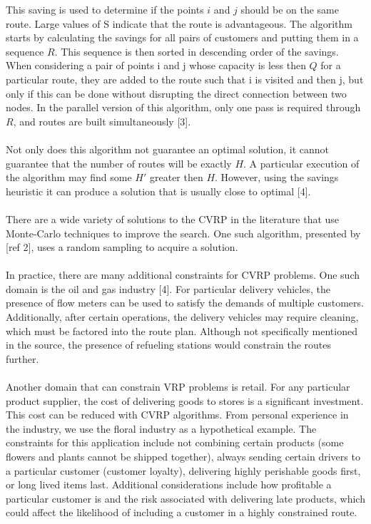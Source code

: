 \documentclass[12pt]{article}
\begin{document}
This saving is used to determine if the points $i$ and $j$ should be on the same route. Large values of S indicate that the route is advantageous. 
The algorithm starts by calculating the savings for all pairs of customers and putting them in a sequence $R$. This sequence is then sorted in descending order of the savings. When considering a pair of points i and j whose capacity is less then $Q$ for a particular route, they are added to the route such that i is visited and then j, but only if this can be done without disrupting the direct connection between two nodes. In the parallel version of this algorithm, only one pass is required through $R$, and routes are built simultaneously [3].
\paragraph{}
Not only does this algorithm not guarantee an optimal solution, it cannot guarantee that the number of routes will be exactly $H$. A particular execution of the algorithm may find some $H\prime$ greater then $H$. However, using the savings heuristic it can produce a solution that is usually close to optimal [4].
\paragraph{}
There are a wide variety of solutions to the CVRP in the literature that use Monte-Carlo techniques to improve the search. One such algorithm, presented by [ref 2], uses a random sampling to acquire a solution.
\paragraph{}
In practice, there are many additional constraints for CVRP problems. One such domain is the oil and gas industry [4]. For particular delivery vehicles, the presence of flow meters can be used to satisfy the demands of multiple customers. Additionally, after certain operations, the delivery vehicles may require cleaning, which must be factored into the route plan. Although not specifically mentioned in the source, the presence of refueling stations would constrain the routes further.

\paragraph{}
Another domain that can constrain VRP problems is retail. For any particular product supplier, the cost of delivering goods to stores is a significant investment. This cost can be reduced with CVRP algorithms. From personal experience in the industry, we use the floral industry as a hypothetical example. The constraints for this application include not combining certain products (some flowers and plants cannot be shipped together), always sending certain drivers to a particular customer (customer loyalty), delivering highly perishable goods first, or long lived items last. Additional considerations include how profitable a particular customer is and the risk associated with delivering late products, which could affect the likelihood of including a customer in a highly constrained route.
\end{document}
